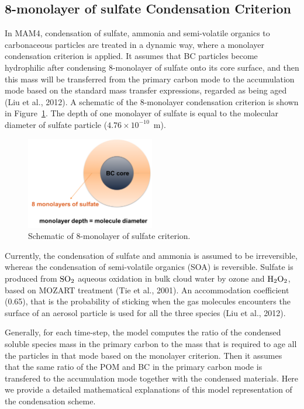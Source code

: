 \documentclass[12pt]{article}
\begin{document}
		
		 \subsection{8-monolayer of sulfate Condensation Criterion}
		
		 In MAM4, condensation of sulfate, ammonia and semi-volatile organics to carbonaceous particles are treated in a dynamic way, where a monolayer condensation criterion is applied. It assumes that BC particles become hydrophilic after condensing 8-monolayer of sulfate onto its core surface, and then this mass will be transferred from the primary carbon mode to the accumulation mode based on the standard mass transfer expressions, regarded as being aged (Liu et al., 2012). A schematic of the 8-monolayer condensation criterion is shown in Figure~\ref{fig_P3}. The depth of one monolayer of sulfate is equal to the molecular diameter of sulfate particle ($4.76\times 10^{-10}$~m).
		 \begin{figure}[!h] 
		 	\begin{center}
		 		\includegraphics[width = 0.5\textwidth]{Figure03}
		 		\caption[]{\label{fig_P3} Schematic of 8-monolayer of sulfate criterion.}
		 	\end{center}
		 \end{figure}
		 
		 Currently, the condensation of sulfate and ammonia is assumed to be irreversible, whereas the condensation of semi-volatile organics (SOA) is reversible. Sulfate is produced from $\rm{SO}_{2}$ aqueous oxidation in bulk cloud water by ozone and $\rm{H}_{2}\rm{O}_{2}$, based on MOZART treatment (Tie et al., 2001). An accommodation coefficient (0.65), that is the probability of sticking when the gas molecules encounters the surface of an aerosol particle is used for all the three species (Liu et al., 2012). 
		 
		 Generally, for each time-step, the model computes the ratio of the  condensed soluble species mass in the primary carbon to the mass that is required to age all the particles in that mode based on the monolayer criterion. Then it assumes that the same ratio of the POM and BC in the primary carbon mode is transfered to the accumulation mode together with the condensed materials. Here we provide a detailed mathematical explanations of this model representation of the condensation scheme. 
		 
\end{document}
